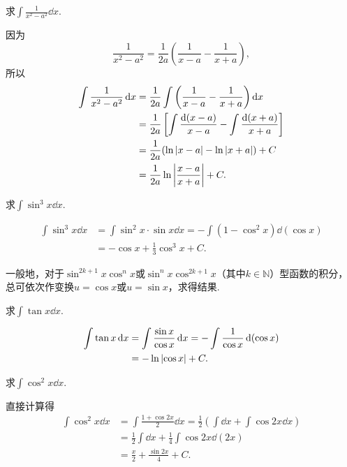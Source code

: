 \begin{example}
求\(\int \frac{1}{x^2 - a^2} \dd{x}\).
\begin{solution}
因为\[
\frac{1}{x^2 - a^2} = \frac{1}{2a} \left(\frac{1}{x-a} - \frac{1}{x+a}\right),
\]所以\begin{align*}
\int \frac{1}{x^2 - a^2} \dd{x}
&= \frac{1}{2a} \int \left(\frac{1}{x-a} - \frac{1}{x+a}\right) \dd{x} \\
&= \frac{1}{2a} \left[ \int \frac{\dd(x-a)}{x-a} - \int \frac{\dd(x+a)}{x+a} \right] \\
&= \frac{1}{2a} ( \ln\abs{x-a} - \ln\abs{x+a} ) + C \\
&= \frac{1}{2a} \ln\abs{\frac{x-a}{x+a}} + C.
\end{align*}
\end{solution}
\end{example}

\begin{example}
求\(\int \sin^3 x \dd{x}\).
\begin{solution}
\begin{align*}
\int \sin^3 x \dd{x}
&= \int \sin^2 x \cdot \sin x \dd{x}
= -\int (1 - \cos^2 x) \dd(\cos x) \\
&= -\cos x + \frac{1}{3} \cos^3 x + C.
\end{align*}
\end{solution}
\end{example}

一般地，对于\(\sin^{2k+1} x \cos^n x\)或\(\sin^n x \cos^{2k+1} x\)（其中\(k\in\mathbb{N}\)）型函数的积分，总可依次作变换\(u = \cos x\)或\(u = \sin x\)，求得结果.

\begin{example}
求\(\int \tan x \dd{x}\).
\begin{solution}
\begin{align*}
\int \tan x \dd{x}
&= \int \frac{\sin x}{\cos x} \dd{x}
= - \int \frac{1}{\cos x} \dd(\cos x) \\
&= - \ln\abs{\cos x} + C.
\end{align*}
\end{solution}
\end{example}

\begin{example}
求\(\int \cos^2 x \dd{x}\).
\begin{solution}
直接计算得
\begin{align*}
	\int \cos^2 x \dd{x}
	&= \int \frac{1 + \cos 2x}{2} \dd{x}
	= \frac{1}{2} \left( \int \dd{x} + \int \cos 2x \dd{x} \right) \\
	&= \frac{1}{2} \int \dd{x} + \frac{1}{4} \int \cos 2x \dd(2x) \\
	&= \frac{x}{2} + \frac{\sin 2x}{4} + C.
\end{align*}
\end{solution}
\end{example}

